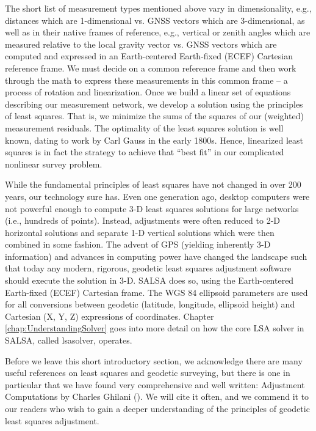 The short list of measurement types mentioned above vary in dimensionality, e.g., distances which are 1-dimensional vs. GNSS vectors which are 3-dimensional, as well as in their native frames of reference, e.g., vertical or zenith angles which are measured relative to the local gravity vector vs. GNSS vectors which are computed and expressed in an Earth-centered Earth-fixed (ECEF) Cartesian reference frame.  We must decide on a common reference frame and then work through the math to express these measurements in this common frame -- a process of rotation and linearization.  Once we build a linear set of equations describing our measurement network, we develop a solution using the principles of least squares.  That is, we minimize the sums of the squares of our (weighted) measurement residuals.  The optimality of the least squares solution is well known, dating to work by Carl Gauss in the early 1800s.  Hence, linearized least squares is in fact the strategy to achieve that ``best fit'' in our complicated nonlinear survey problem.

While the fundamental principles of least squares have not changed in over 200 years, our technology sure has.  Even one generation ago, desktop computers were not powerful enough to compute 3-D least squares solutions for large networks (i.e., hundreds of points).  Instead, adjustments were often reduced to 2-D horizontal solutions and separate 1-D vertical solutions which were then combined in some fashion.  The advent of GPS (yielding inherently 3-D information) and advances in computing power have changed the landscape such that today any modern, rigorous, geodetic least squares adjustment software should execute the solution in 3-D.  SALSA does so, using the Earth-centered Earth-fixed (ECEF) Cartesian frame.  The WGS 84 ellipsoid parameters are used for all conversions between geodetic (latitude, longitude, ellipsoid height) and Cartesian (X, Y, Z) expressions of coordinates.  Chapter \ref{chap:UnderstandingSolver} goes into more detail on how the core LSA solver in SALSA, called \textsf{lsasolver}, operates.


Before we leave this short introductory section, we acknowledge there are many useful references on least squares and geodetic surveying, but there is one in particular that we have found very comprehensive and well written: Adjustment Computations by Charles Ghilani (\cite{ghilani}).  We will cite it often, and we commend it to our readers who wish to gain a deeper understanding of the principles of geodetic least squares adjustment.

